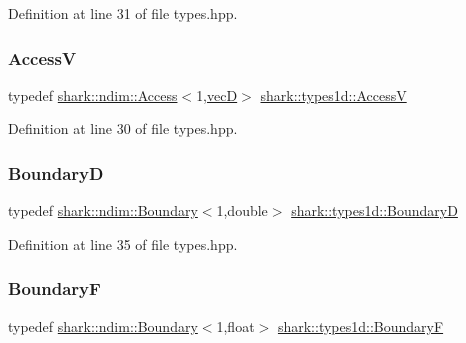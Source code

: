 Definition at line 31 of file types.\+hpp.

\hypertarget{namespaceshark_1_1types1d_a2469604c6867c0615237809c14396e97}{}\label{namespaceshark_1_1types1d_a2469604c6867c0615237809c14396e97} 
\subsubsection{\texorpdfstring{AccessV}{AccessV}}
{\footnotesize\ttfamily typedef \hyperlink{classshark_1_1ndim_1_1_access}{shark\+::ndim\+::\+Access}$<$1,\hyperlink{namespaceshark_1_1types1d_a96b222de82755e7cdf915ca4652abb00}{vecD}$>$ \hyperlink{namespaceshark_1_1types1d_a2469604c6867c0615237809c14396e97}{shark\+::types1d\+::\+AccessV}}



Definition at line 30 of file types.\+hpp.

\hypertarget{namespaceshark_1_1types1d_a9be30f785b4a9f1dcdac178dacf92cab}{}\label{namespaceshark_1_1types1d_a9be30f785b4a9f1dcdac178dacf92cab} 
\subsubsection{\texorpdfstring{BoundaryD}{BoundaryD}}
{\footnotesize\ttfamily typedef \hyperlink{classshark_1_1ndim_1_1_boundary}{shark\+::ndim\+::\+Boundary}$<$1,double$>$ \hyperlink{namespaceshark_1_1types1d_a9be30f785b4a9f1dcdac178dacf92cab}{shark\+::types1d\+::\+BoundaryD}}



Definition at line 35 of file types.\+hpp.

\hypertarget{namespaceshark_1_1types1d_af5648fa4f31ae57e91d3b749136deb48}{}\label{namespaceshark_1_1types1d_af5648fa4f31ae57e91d3b749136deb48} 
\subsubsection{\texorpdfstring{BoundaryF}{BoundaryF}}
{\footnotesize\ttfamily typedef \hyperlink{classshark_1_1ndim_1_1_boundary}{shark\+::ndim\+::\+Boundary}$<$1,float$>$ \hyperlink{namespaceshark_1_1types1d_af5648fa4f31ae57e91d3b749136deb48}{shark\+::types1d\+::\+BoundaryF}}



